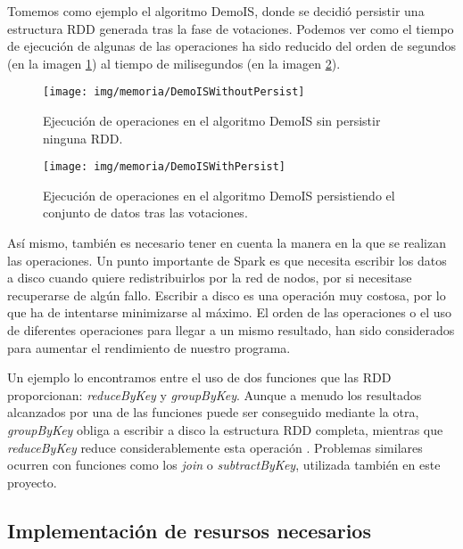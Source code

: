 Tomemos como ejemplo el algoritmo DemoIS, donde se decidió persistir una estructura RDD generada tras la fase de votaciones. Podemos ver como el tiempo de ejecución de algunas de las operaciones ha sido reducido del orden de segundos (en la imagen \ref{fig:img/memoria/DemoISWithoutPersist}) al tiempo de milisegundos (en la imagen \ref{fig:img/memoria/DemoISWithPersist}).

	\begin{figure}[!h]
		\centering
		\texttt{[image: img/memoria/DemoISWithoutPersist]}
		\caption{Ejecución de operaciones en el algoritmo DemoIS sin persistir ninguna RDD.}\label{fig:img/memoria/DemoISWithoutPersist}
	\end{figure}
	\FloatBarrier
	
		\begin{figure}[!h]
		\centering
		\texttt{[image: img/memoria/DemoISWithPersist]}
		\caption{Ejecución de operaciones en el algoritmo DemoIS persistiendo el conjunto de datos tras las votaciones.}\label{fig:img/memoria/DemoISWithPersist}
	\end{figure}
	\FloatBarrier


Así mismo, también es necesario tener en cuenta la manera en la que se realizan las operaciones. Un punto importante de Spark es que necesita escribir los datos a disco cuando quiere redistribuirlos por la red de nodos, por si necesitase recuperarse de algún fallo. Escribir a disco es una operación muy costosa, por lo que ha de intentarse minimizarse al máximo. El orden de las operaciones o el uso de diferentes operaciones para llegar a un mismo resultado, han sido considerados para aumentar el rendimiento de nuestro programa.

Un ejemplo lo encontramos entre el uso de dos funciones que las RDD proporcionan: \textit{reduceByKey} y \textit{groupByKey}. Aunque a menudo los resultados alcanzados por una de las funciones puede ser conseguido mediante la otra, \textit{groupByKey} obliga a escribir a disco la estructura RDD completa, mientras que \textit{reduceByKey} reduce considerablemente esta operación \cite{ShuffleSpark}. Problemas similares ocurren con funciones como los \textit{join} o \textit{subtractByKey}, utilizada también en este proyecto.

\subsection{Implementación de resursos necesarios}\label{sec:ImplRecursosAdicionales}

